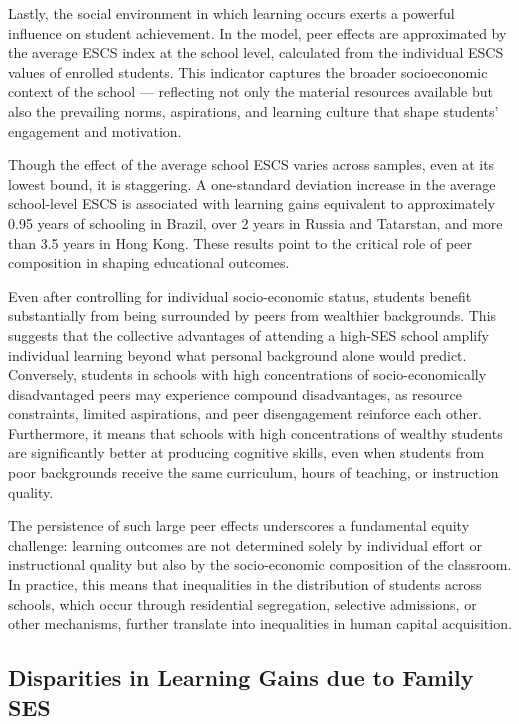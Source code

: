\documentclass[
]{article}
\begin{document}
Lastly, the social environment in which learning occurs exerts a
powerful influence on student achievement. In the model, peer effects
are approximated by the average ESCS index at the school level,
calculated from the individual ESCS values of enrolled students. This
indicator captures the broader socioeconomic context of the school ---
reflecting not only the material resources available but also the
prevailing norms, aspirations, and learning culture that shape students'
engagement and motivation.

Though the effect of the average school ESCS varies across samples, even
at its lowest bound, it is staggering. A one-standard deviation increase
in the average school-level ESCS is associated with learning gains
equivalent to approximately 0.95 years of schooling in Brazil, over 2
years in Russia and Tatarstan, and more than 3.5 years in Hong Kong.
These results point to the critical role of peer composition in shaping
educational outcomes.

Even after controlling for individual socio-economic status, students
benefit substantially from being surrounded by peers from wealthier
backgrounds. This suggests that the collective advantages of attending a
high-SES school amplify individual learning beyond what personal
background alone would predict. Conversely, students in schools with
high concentrations of socio-economically disadvantaged peers may
experience compound disadvantages, as resource constraints, limited
aspirations, and peer disengagement reinforce each other. Furthermore,
it means that schools with high concentrations of wealthy students are
significantly better at producing cognitive skills, even when students
from poor backgrounds receive the same curriculum, hours of teaching, or
instruction quality.

The persistence of such large peer effects underscores a fundamental
equity challenge: learning outcomes are not determined solely by
individual effort or instructional quality but also by the
socio-economic composition of the classroom. In practice, this means
that inequalities in the distribution of students across schools, which
occur through residential segregation, selective admissions, or other
mechanisms, further translate into inequalities in human capital
acquisition.

\subsection{Disparities in Learning Gains due to Family
SES}\label{disparities-in-learning-gains-due-to-family-ses}
\end{document}
